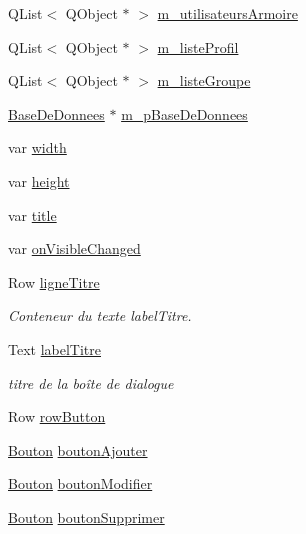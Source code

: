 \begin{DoxyCompactItemize}
\item 
Q\+List$<$ Q\+Object $\ast$ $>$ \hyperlink{class_utilisateurs_armoire_aade1e94417c9729b9e8cadaf19e3227d}{m\+\_\+utilisateurs\+Armoire}
\item 
Q\+List$<$ Q\+Object $\ast$ $>$ \hyperlink{class_utilisateurs_armoire_a0687ace99585d71b2636feaf2163b905}{m\+\_\+liste\+Profil}
\item 
Q\+List$<$ Q\+Object $\ast$ $>$ \hyperlink{class_utilisateurs_armoire_a85558a0f373c06315c3c5f2e4e9e660c}{m\+\_\+liste\+Groupe}
\item 
\hyperlink{class_base_de_donnees}{Base\+De\+Donnees} $\ast$ \hyperlink{class_utilisateurs_armoire_ac43b4894f5036117d044ad2d22b09318}{m\+\_\+p\+Base\+De\+Donnees}
\item 
var \hyperlink{class_utilisateurs_armoire_ad756dc2f8b42b46fa1e4dfaf362e9adc}{width}
\item 
var \hyperlink{class_utilisateurs_armoire_af77c416abcdd9953893754328bb1235c}{height}
\item 
var \hyperlink{class_utilisateurs_armoire_abece135e2fd9d684307d1a208bdeca13}{title}
\item 
var \hyperlink{class_utilisateurs_armoire_a2a416bb6bd13fb03a2c7cf6f71882a9d}{on\+Visible\+Changed}
\item 
Row \hyperlink{class_utilisateurs_armoire_a7d84493172558e34459abd91e0413ea5}{ligne\+Titre}
\begin{DoxyCompactList}\small\item\em Conteneur du texte label\+Titre. \end{DoxyCompactList}\item 
Text \hyperlink{class_utilisateurs_armoire_a4b8cc25772b0d16e2feaa676b6994832}{label\+Titre}
\begin{DoxyCompactList}\small\item\em titre de la boîte de dialogue \end{DoxyCompactList}\item 
Row \hyperlink{class_utilisateurs_armoire_a9b3a4397aeaea4355fcab2c0e7fa3915}{row\+Button}
\item 
\hyperlink{class_bouton}{Bouton} \hyperlink{class_utilisateurs_armoire_ace608d59fbb70792c0a98647bc183f01}{bouton\+Ajouter}
\item 
\hyperlink{class_bouton}{Bouton} \hyperlink{class_utilisateurs_armoire_abf62e560c045aab6553e34e2679ff54e}{bouton\+Modifier}
\item 
\hyperlink{class_bouton}{Bouton} \hyperlink{class_utilisateurs_armoire_a5d3c8fe333a18ebe157d269a01776c63}{bouton\+Supprimer}

\end{DoxyCompactItemize}
